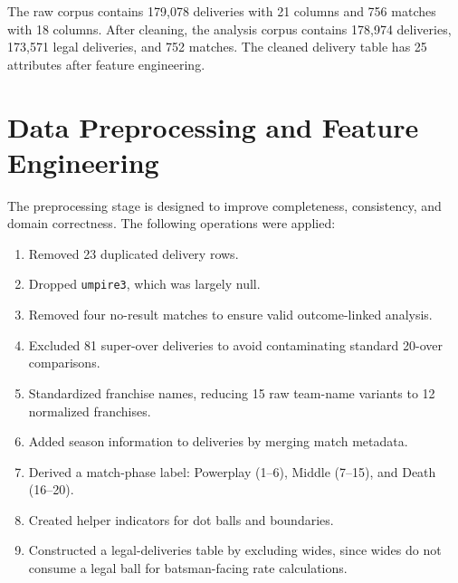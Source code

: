 \documentclass[conference]{IEEEtran}
\begin{document}
The raw corpus contains 179,078 deliveries with 21 columns and 756 matches with 18 columns. After cleaning, the analysis corpus contains 178,974 deliveries, 173,571 legal deliveries, and 752 matches. The cleaned delivery table has 25 attributes after feature engineering.

\begin{table}[ht]
\centering
\caption{Dataset Summary Before and After Preprocessing}
\label{tab:dataset}
\end{table}

\section{Data Preprocessing and Feature Engineering}
The preprocessing stage is designed to improve completeness, consistency, and domain correctness. The following operations were applied:
\begin{enumerate}
    \item Removed 23 duplicated delivery rows.
    \item Dropped \texttt{umpire3}, which was largely null.
    \item Removed four no-result matches to ensure valid outcome-linked analysis.
    \item Excluded 81 super-over deliveries to avoid contaminating standard 20-over comparisons.
    \item Standardized franchise names, reducing 15 raw team-name variants to 12 normalized franchises.
    \item Added season information to deliveries by merging match metadata.
    \item Derived a match-phase label: Powerplay (1--6), Middle (7--15), and Death (16--20).
    \item Created helper indicators for dot balls and boundaries.
    \item Constructed a legal-deliveries table by excluding wides, since wides do not consume a legal ball for batsman-facing rate calculations.
\end{enumerate}
\end{document}

